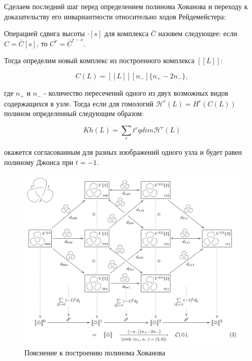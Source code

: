 \documentclass[a4paper,8pt]{extarticle}
\begin{document}
\begin{multicols}{2}
    Сделаем последний шаг перед определением полинома Хованова и переходу
    к доказательству его инвариантности относительно ходов 
    Рейдемейстера:
    
    \begin{definition}
    	Операцией сдвига высоты $\cdot [s]$ для комплекса $\bar{C}$ назовем 
    	следующее: если $C = \bar{C}[s]$, то $C^r = \bar{C}^{r-s}$.
    \end{definition}

	Тогда определим новый комплекс из построенного комплекса $[[L]]$:
	
	\begin{equation}
		C(L) = [[L]][n_-]\{n_+ - 2n_-\},
	\end{equation}

	где $n_+$ и $n_-$ - количество пересечений одного из двух возможных видов содержащихся в узле. Тогда если для гомологий $\mathcal{H}^r(L) = H^r(C(L))$ полином определенный следующим образом:
	
	\begin{equation}
		Kh(L) = \sum\limits_r t^r qdim \mathcal{H}^r(L)
	\end{equation}

	окажется согласованным для разных изображений одного узла и будет равен полиному Джонса при $t = -1$.

\end{multicols}

\begin{figure}[h]
  \centering
  \includegraphics[width=0.8\linewidth]{../img/bar-natan-2.png}
  \caption{Пояснение к построению полинома Хованова \parencite{bar-natan}}
  \label{fig:bar-natan-2}
\end{figure}

\printbibliography
\end{document}
